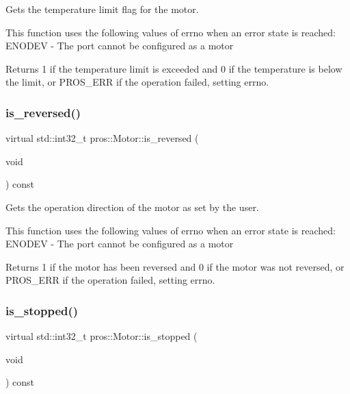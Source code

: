 Gets the temperature limit flag for the motor.

This function uses the following values of errno when an error state is reached\+: E\+N\+O\+D\+EV -\/ The port cannot be configured as a motor

\begin{DoxyReturn}{Returns}
1 if the temperature limit is exceeded and 0 if the temperature is below the limit, or P\+R\+O\+S\+\_\+\+E\+RR if the operation failed, setting errno. 
\end{DoxyReturn}
\mbox{\label{classpros_1_1Motor_a5122faa60ef7745761eca847192560c5}} 
\subsubsection{\texorpdfstring{is\+\_\+reversed()}{is\_reversed()}}
{\footnotesize\ttfamily virtual std\+::int32\+\_\+t pros\+::\+Motor\+::is\+\_\+reversed (\begin{DoxyParamCaption}\item[{void}]{ }\end{DoxyParamCaption}) const\hspace{0.3cm}{\ttfamily [virtual]}}

Gets the operation direction of the motor as set by the user.

This function uses the following values of errno when an error state is reached\+: E\+N\+O\+D\+EV -\/ The port cannot be configured as a motor

\begin{DoxyReturn}{Returns}
1 if the motor has been reversed and 0 if the motor was not reversed, or P\+R\+O\+S\+\_\+\+E\+RR if the operation failed, setting errno. 
\end{DoxyReturn}
\mbox{\label{classpros_1_1Motor_a884c19ae71a6c9f0b316520f09769be9}} 
\subsubsection{\texorpdfstring{is\+\_\+stopped()}{is\_stopped()}}
{\footnotesize\ttfamily virtual std\+::int32\+\_\+t pros\+::\+Motor\+::is\+\_\+stopped (\begin{DoxyParamCaption}\item[{void}]{ }\end{DoxyParamCaption}) const\hspace{0.3cm}{\ttfamily [virtual]}}

